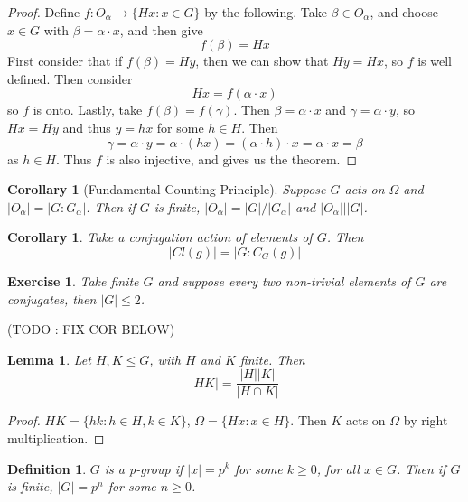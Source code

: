 \documentclass[a4paper,10pt]{article}
\newtheorem{Def}[thm]{Definition}
\newtheorem{Cor}[thm]{Corollary}
\newtheorem{Ex}[thm]{Exercise}
\newtheorem{Lem}[thm]{Lemma}
\begin{document}
\begin{proof}
Define $f : O_\alpha \rightarrow \{ Hx : x \in G \}$ by the following. Take $\beta \in O_\alpha$, and choose $x \in G$ with $\beta = \alpha \cdot x$, and then give
\[ f(\beta) = Hx \]
First consider that if $f(\beta) = Hy$, then we can show that $Hy = Hx$, so $f$ is well defined. Then consider 
\[ Hx = f(\alpha \cdot x) \]
so $f$ is onto. Lastly, take $f(\beta) = f(\gamma)$. Then $\beta = \alpha \cdot x$ and $\gamma = \alpha \cdot y$, so $Hx = Hy$ and thus $y = hx$ for some $h \in H$. Then
\[ \gamma = \alpha \cdot y = \alpha \cdot (hx) = (\alpha \cdot h) \cdot x = \alpha \cdot x = \beta \]
as $h \in H$. Thus $f$ is also injective, and gives us the theorem.
\end{proof}

\begin{Cor}[Fundamental Counting Principle]
Suppose $G$ acts on $\Omega$ and $| O_\alpha | = |G : G_\alpha|$. Then if $G$ is finite, $|O_\alpha| = |G| / |G_\alpha|$ and $|O_\alpha| \big| |G|$. 
\end{Cor}

\begin{Cor}
Take a conjugation action of elements of $G$. Then
\[ |Cl(g) |= |G : C_G(g)| \]
\end{Cor}
\begin{Ex}
Take finite $G$ and suppose every two non-trivial elements of $G$ are conjugates, then $|G| \leq 2$. 
\end{Ex}


(TODO : FIX COR BELOW)

\begin{Lem}
Let $H,K \leq G$, with $H$ and $K$ finite. Then
\[ |HK| = \frac{|H||K|}{|H \cap K|} \]
\end{Lem}

\begin{proof}
$HK = \{ hk : h \in H, k \in K\}$, $\Omega = \{Hx : x \in H\}$. Then $K$ acts on $\Omega$ by right multiplication.
\end{proof}

\begin{Def}
$G$ is a p-group if $|x| = p^k$ for some $k \geq 0$, for all $x \in G$. Then if $G$ is finite, $|G| = p^n$ for some $n \geq 0$. 
\end{Def}
\end{document}
